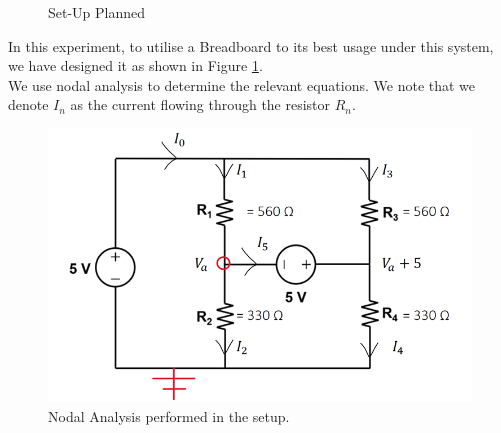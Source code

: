\documentclass{article}
\begin{document}
\begin{figure}[htbp]
\centering
{}\label{fig:setup2}
\label{fig:breadboard2}

\caption{Set-Up Planned} \label{fig:2}
\end{figure}

In this experiment, to utilise a Breadboard to its best usage under this system, we have designed it as shown in Figure \ref{fig:2}. \\

We use nodal analysis to determine the relevant equations. We note that we denote $I_n$ as the current flowing through the resistor $R_n$.

\begin{figure}[h!]
    \centering
    \includegraphics[width=\textwidth]{images/nodalAnalysis2.png}
    \caption{Nodal Analysis performed in the setup.}
    \label{fig:nodal2}
\end{figure}
\end{document}
